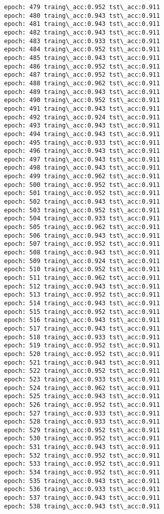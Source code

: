 \documentclass[11pt]{article}
\begin{document}
\begin{Verbatim}[commandchars=\\\{\}]
epoch: 479 traing\_acc:0.952 tst\_acc:0.911
epoch: 480 traing\_acc:0.943 tst\_acc:0.911
epoch: 481 traing\_acc:0.943 tst\_acc:0.911
epoch: 482 traing\_acc:0.943 tst\_acc:0.911
epoch: 483 traing\_acc:0.933 tst\_acc:0.911
epoch: 484 traing\_acc:0.952 tst\_acc:0.911
epoch: 485 traing\_acc:0.943 tst\_acc:0.911
epoch: 486 traing\_acc:0.952 tst\_acc:0.911
epoch: 487 traing\_acc:0.952 tst\_acc:0.911
epoch: 488 traing\_acc:0.962 tst\_acc:0.911
epoch: 489 traing\_acc:0.943 tst\_acc:0.911
epoch: 490 traing\_acc:0.952 tst\_acc:0.911
epoch: 491 traing\_acc:0.943 tst\_acc:0.911
epoch: 492 traing\_acc:0.924 tst\_acc:0.911
epoch: 493 traing\_acc:0.943 tst\_acc:0.911
epoch: 494 traing\_acc:0.943 tst\_acc:0.911
epoch: 495 traing\_acc:0.933 tst\_acc:0.911
epoch: 496 traing\_acc:0.943 tst\_acc:0.911
epoch: 497 traing\_acc:0.943 tst\_acc:0.911
epoch: 498 traing\_acc:0.943 tst\_acc:0.911
epoch: 499 traing\_acc:0.962 tst\_acc:0.911
epoch: 500 traing\_acc:0.952 tst\_acc:0.911
epoch: 501 traing\_acc:0.952 tst\_acc:0.911
epoch: 502 traing\_acc:0.943 tst\_acc:0.911
epoch: 503 traing\_acc:0.952 tst\_acc:0.911
epoch: 504 traing\_acc:0.933 tst\_acc:0.911
epoch: 505 traing\_acc:0.962 tst\_acc:0.911
epoch: 506 traing\_acc:0.943 tst\_acc:0.911
epoch: 507 traing\_acc:0.952 tst\_acc:0.911
epoch: 508 traing\_acc:0.943 tst\_acc:0.911
epoch: 509 traing\_acc:0.924 tst\_acc:0.911
epoch: 510 traing\_acc:0.952 tst\_acc:0.911
epoch: 511 traing\_acc:0.962 tst\_acc:0.911
epoch: 512 traing\_acc:0.943 tst\_acc:0.911
epoch: 513 traing\_acc:0.952 tst\_acc:0.911
epoch: 514 traing\_acc:0.943 tst\_acc:0.911
epoch: 515 traing\_acc:0.952 tst\_acc:0.911
epoch: 516 traing\_acc:0.943 tst\_acc:0.911
epoch: 517 traing\_acc:0.943 tst\_acc:0.911
epoch: 518 traing\_acc:0.933 tst\_acc:0.911
epoch: 519 traing\_acc:0.952 tst\_acc:0.911
epoch: 520 traing\_acc:0.952 tst\_acc:0.911
epoch: 521 traing\_acc:0.943 tst\_acc:0.911
epoch: 522 traing\_acc:0.952 tst\_acc:0.911
epoch: 523 traing\_acc:0.933 tst\_acc:0.911
epoch: 524 traing\_acc:0.962 tst\_acc:0.911
epoch: 525 traing\_acc:0.943 tst\_acc:0.911
epoch: 526 traing\_acc:0.952 tst\_acc:0.911
epoch: 527 traing\_acc:0.933 tst\_acc:0.911
epoch: 528 traing\_acc:0.933 tst\_acc:0.911
epoch: 529 traing\_acc:0.952 tst\_acc:0.911
epoch: 530 traing\_acc:0.952 tst\_acc:0.911
epoch: 531 traing\_acc:0.943 tst\_acc:0.911
epoch: 532 traing\_acc:0.952 tst\_acc:0.911
epoch: 533 traing\_acc:0.952 tst\_acc:0.911
epoch: 534 traing\_acc:0.952 tst\_acc:0.911
epoch: 535 traing\_acc:0.943 tst\_acc:0.911
epoch: 536 traing\_acc:0.933 tst\_acc:0.911
epoch: 537 traing\_acc:0.943 tst\_acc:0.911
epoch: 538 traing\_acc:0.943 tst\_acc:0.911

\end{Verbatim}
\end{document}
